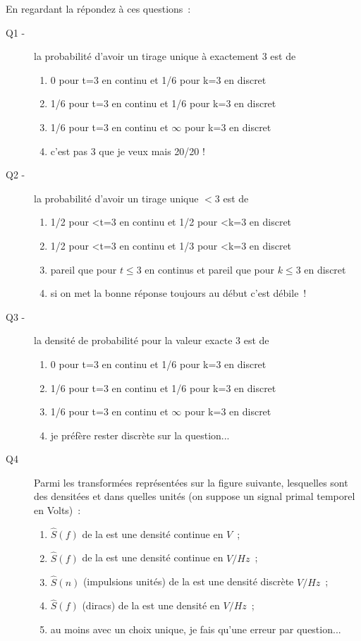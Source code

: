 \begin{quizz}

  
  En regardant la  répondez à ces questions~:
  \begin{description}
  \item[Q1 -] la probabilité d'avoir un tirage unique à exactement 3
    est de
    \begin{enumerate}
    \item 0 pour t=3 en continu et 1/6 pour k=3 en discret
    \item 1/6 pour t=3 en continu et 1/6 pour k=3 en discret
    \item 1/6 pour t=3 en continu et $\infty$ pour k=3 en discret
    \item c'est pas 3 que je veux mais 20/20 !
    \end{enumerate}
  \item[Q2 -] la probabilité d'avoir un tirage unique $ <3$ est de
    \begin{enumerate}
    \item 1/2 pour <t=3 en continu et 1/2 pour <k=3 en discret
    \item 1/2 pour <t=3 en continu et 1/3 pour <k=3 en discret
    \item pareil que pour $t\leq3$ en continus et pareil que pour
      $k\leq3$ en discret
    \item si on met la bonne réponse toujours au début c'est débile~!
    \end{enumerate}
  \item[Q3 -] la densité de probabilité pour la valeur exacte 3 est de
    \begin{enumerate}
    \item 0 pour t=3 en continu et 1/6 pour k=3 en discret
    \item 1/6 pour t=3 en continu et 1/6 pour k=3 en discret
    \item 1/6 pour t=3 en continu et $\infty$ pour k=3 en discret
    \item je préfère rester discrète sur la question...
    \end{enumerate}
  \item[Q4] Parmi les transformées représentées sur la figure
    suivante, lesquelles sont des densitées et dans quelles unités (on
    suppose un signal primal temporel en Volts)~:
    \begin{enumerate}
    \item $\hat{S}(f)$ de la \TF{} est une densité continue en $V$~;
    \item $\hat{S}(f)$ de la \TF{} est une densité continue en
      $V/Hz$~;
    \item $\hat{S}(n)$ (impulsions unités) de la \sdf{} est une
      densité discrète $V/Hz$~;
    \item $\hat{S}(f)$ (diracs) de la \sdf{} est une densité en
      $V/Hz$~;
    \item au moins avec un choix unique, je fais qu'une erreur par
      question...
    \end{enumerate}

  \end{description}
\end{quizz}

